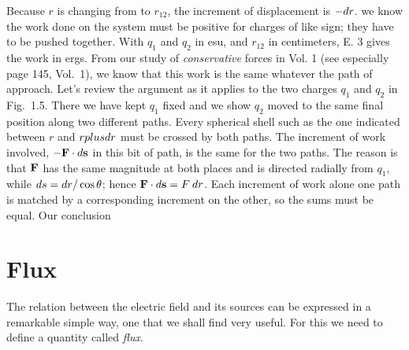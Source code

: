 Because $r$ is changing from  to $r_{12}$, the increment of
displacement is $-d r$. we know the work done on the system must be
positive for charges of like sign; they have to be pushed together.
With $q_1$ and $q_2$ in esu, and $r_{12}$ in centimeters, E. 3 gives
the work in ergs. From our study of \emph{conservative} forces in
Vol. 1 (see especially page 145, Vol.~1), we know that this work is
the same whatever the path of approach. Let's review the argument as
it applies to the two charges $q_1$ and $q_2$ in Fig.~1.5. There we
have kept $q_1$ fixed and we show $q_2$ moved to the same final
position along two different paths. Every spherical shell such as the
one indicated between $r$ and $r plus d r$ must be crossed by both
paths. The increment of work involved, $-\mathbf{F}\cdot d\mathbf{s}$ in this bit of path,
is the same for the two paths. The reason is that $\mathbf{F}$ has the same
magnitude at both places and is directed radially from $q_1$, while
$d s = d r/\cos\theta$; hence $\mathbf{F}\cdot d\mathbf{s} = F\: d r$. Each increment of work
alone one path is matched by a corresponding increment on the other,
so the sums must be equal. Our conclusion


\section{Flux}

The relation between the electric field and its sources can be
expressed in a remarkable simple way, one that we shall find very
useful. For this we need to define a quantity called \emph{flux}.

